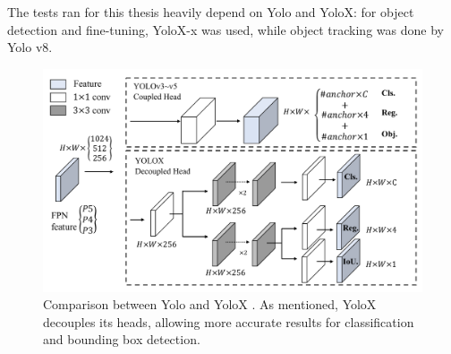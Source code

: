The tests ran for this thesis heavily depend on Yolo and YoloX: for object detection and fine-tuning, YoloX-x was used, while object tracking was done by Yolo v8.

\begin{figure}[H]
  \centering
  \includegraphics[width=\textwidth]{figures/related_work/yolox-graphic.pdf}
  \caption{Comparison between Yolo and YoloX \cite{yolox2021}. As mentioned, YoloX decouples its heads, allowing more accurate results for classification and bounding box detection.}
  \label{fig:yolox_multi_head}
  \clearpage
\end{figure}